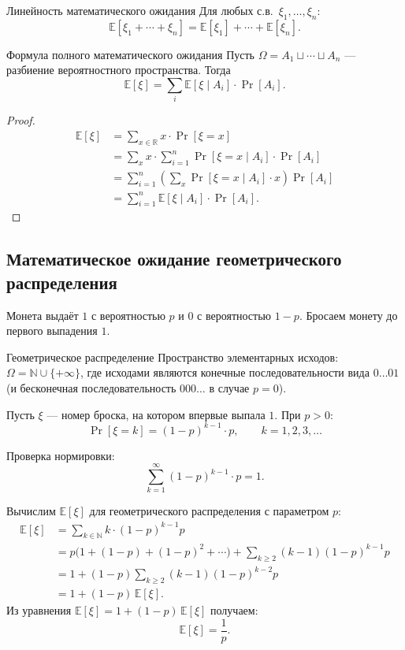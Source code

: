 \begin{Statement}{Линейность математического ожидания}{}
	Для любых с.в.\ $\xi_1, \ldots, \xi_n$:
	\[
	\mathbb{E}[\xi_1 + \cdots + \xi_n] = \mathbb{E}[\xi_1] + \cdots + \mathbb{E}[\xi_n].
	\]
\end{Statement}

\begin{Theorem}{Формула полного математического ожидания}{}
	Пусть $\Omega = A_1 \sqcup \cdots \sqcup A_n$ — разбиение вероятностного пространства. Тогда
	\[
	\mathbb{E}[\xi] = \sum_{i} \mathbb{E}[\xi \mid A_i] \cdot \Pr[A_i].
	\]
\end{Theorem}

\begin{proof}
	\begin{align*}
		\mathbb{E}[\xi]
		&= \sum_{x \in \mathbb{R}} x \cdot \Pr[\xi = x] \\
		&= \sum_{x} x \cdot \sum_{i=1}^{n} \Pr[\xi = x \mid A_i] \cdot \Pr[A_i] \\
		&= \sum_{i=1}^{n} \left( \sum_{x} \Pr[\xi = x \mid A_i] \cdot x \right) \Pr[A_i] \\
		&= \sum_{i=1}^{n} \mathbb{E}[\xi \mid A_i] \cdot \Pr[A_i].
	\end{align*}
\end{proof}

\subsection{Математическое ожидание геометрического распределения}

Монета выдаёт $1$ с вероятностью $p$ и $0$ с вероятностью $1-p$. Бросаем монету до первого выпадения $1$.

\begin{Example}{Геометрическое распределение}{}
	Пространство элементарных исходов: $\Omega = \mathbb{N} \cup \{+\infty\}$, где исходами являются конечные последовательности вида $0\ldots01$ (и бесконечная последовательность $000\ldots$ в случае $p = 0$).
	
	Пусть $\xi$ — номер броска, на котором впервые выпала $1$. При $p > 0$:
	\[
	\Pr[\xi = k] = (1-p)^{k-1} \cdot p, \qquad k = 1, 2, 3, \ldots
	\]
	
	\begin{Remark}{}{}
		Проверка нормировки:
		\[
		\sum_{k=1}^{\infty} (1-p)^{k-1} \cdot p = 1.
		\]
	\end{Remark}
\end{Example}

Вычислим $\mathbb{E}[\xi]$ для геометрического распределения с параметром $p$:
\begin{align*}
	\mathbb{E}[\xi]
	&= \sum_{k \in \mathbb{N}} k \cdot (1-p)^{k-1} p \\
	&= p\bigl(1 + (1-p) + (1-p)^2 + \cdots\bigr)
	+ \sum_{k \geq 2} (k-1)(1-p)^{k-1} p \\
	&= 1 + (1-p) \sum_{k \geq 2} (k-1)(1-p)^{k-2} p \\
	&= 1 + (1-p)\,\mathbb{E}[\xi].
\end{align*}
Из уравнения $\mathbb{E}[\xi] = 1 + (1-p)\,\mathbb{E}[\xi]$ получаем:
\[
\mathbb{E}[\xi] = \frac{1}{p}.
\]

